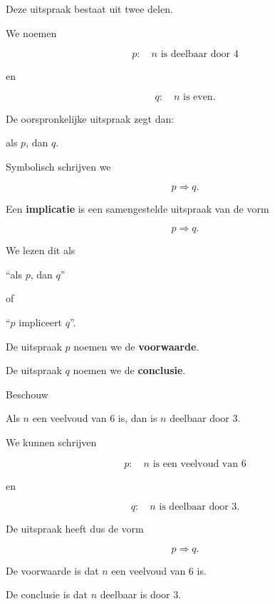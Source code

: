 \documentclass{ximera}
\begin{document}
Deze uitspraak bestaat uit twee delen.

We noemen

\[
p:\quad n\text{ is deelbaar door }4
\]

en

\[
q:\quad n\text{ is even}.
\]

De oorspronkelijke uitspraak zegt dan:

\begin{center}
als $p$, dan $q$.
\end{center}

Symbolisch schrijven we

\[
p\Rightarrow q.
\]


\begin{definitie}

Een \textbf{implicatie} is een samengestelde uitspraak van de vorm

\[
p\Rightarrow q.
\]

We lezen dit als

\begin{center}
``als $p$, dan $q$''
\end{center}

of

\begin{center}
``$p$ impliceert $q$''.
\end{center}

De uitspraak $p$ noemen we de \textbf{voorwaarde}.

De uitspraak $q$ noemen we de \textbf{conclusie}.

\end{definitie}


\begin{voorbeeld}

Beschouw

\begin{center}
Als $n$ een veelvoud van $6$ is, dan is $n$ deelbaar door $3$.
\end{center}

We kunnen schrijven

\[
p:\quad n\text{ is een veelvoud van }6
\]

en

\[
q:\quad n\text{ is deelbaar door }3.
\]

De uitspraak heeft dus de vorm

\[
p\Rightarrow q.
\]

De voorwaarde is dat $n$ een veelvoud van $6$ is.

De conclusie is dat $n$ deelbaar is door $3$.

\end{voorbeeld}
\end{document}
